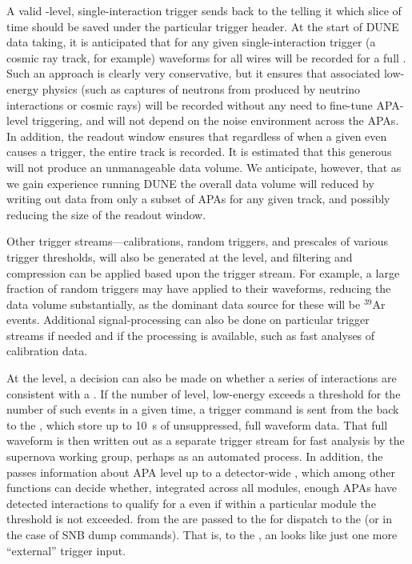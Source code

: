 A valid -level, single-interaction trigger sends
 back to the  telling it which slice
of time should be saved under the particular trigger header. 
At the start of DUNE data taking, it is anticipated that for any given
single-interaction trigger (a cosmic ray track, for example) waveforms
for all wires will be recorded for a full \readout {}. 
Such an approach is clearly very conservative, but it ensures that
associated low-energy physics (such as captures of neutrons from
produced by neutrino interactions or cosmic rays) will be recorded
without any need to fine-tune APA-level triggering, and will not
depend on the noise environment across the APAs. 
In addition, the \readout readout window ensures that regardless of when
a given even causes a trigger, the entire track is recorded. 
It is estimated that this generous  will not
produce an unmanageable data volume. 
We anticipate, however, that as we gain experience running DUNE the
overall data volume will reduced by writing out data from only a
subset of APAs for any given track, and possibly reducing the size of
the readout window.

Other trigger streams---calibrations, random triggers, and prescales
of various trigger thresholds, will also be generated at the
 level, and filtering and compression can be applied
based upon the trigger stream. 
For example, a large fraction of random triggers may have 
applied to their waveforms, reducing the data volume substantially, as
the dominant data source for these will be $^{39}$Ar events.
Additional signal-processing can also be done on particular trigger
streams if needed and if the processing is available, such as fast
analyses of calibration data.

At the  level, a decision can also be made on whether
a series of interactions are consistent with a . 
If the number of  level, low-energy 
exceeds a threshold for the number of such events in a given time, a
trigger command is sent from the  back to the ,
which store up to \SI{10}{\s} of unsuppressed, full waveform data. 
That full waveform is then written out as a separate trigger stream
for fast analysis by the supernova working group, perhaps as an
automated process. 
In addition, the  passes information about APA level
 up to a detector-wide , which among
other functions can decide whether, integrated across all modules,
enough APAs have detected interactions to qualify for a 
even if within a particular module the threshold is not exceeded. 
 from the  are passed to the
 for dispatch to the  (or  in the
case of SNB dump commands). 
That is, to the , an  looks like just
one more ``external'' trigger input.

